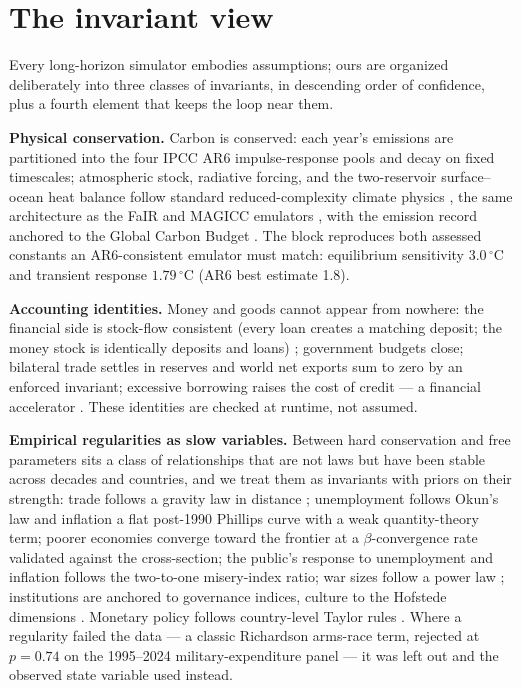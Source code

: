 \documentclass[a4paper,fleqn]{cas-sc}
\begin{document}
\section{The invariant view}
\label{sec:invariants}

Every long-horizon simulator embodies assumptions; ours are organized deliberately into three
classes of invariants, in descending order of confidence, plus a fourth element that keeps the
loop near them.

\textbf{Physical conservation.} Carbon is conserved: each year's emissions are partitioned into
the four IPCC AR6 impulse-response pools and decay on fixed timescales; atmospheric stock,
radiative forcing, and the two-reservoir surface--ocean heat balance follow standard
reduced-complexity climate physics \citep{joos2013,geoffroy2013,ipcc_ar6_wg1}, the same
architecture as the FaIR and MAGICC emulators \citep{smith2018fair,meinshausen2011}, with the
emission record anchored to the Global Carbon Budget \citep{friedlingstein2023}. The block reproduces both
assessed constants an AR6-consistent emulator must match: equilibrium sensitivity
$3.0\,^{\circ}$C and transient response $1.79\,^{\circ}$C (AR6 best estimate 1.8).

\textbf{Accounting identities.} Money and goods cannot appear from nowhere: the financial side
is stock-flow consistent (every loan creates a matching deposit; the money stock is identically
deposits and loans) \citep{godley2007}; government budgets close; bilateral trade settles in
reserves and world net exports sum to zero by an enforced invariant; excessive borrowing raises
the cost of credit --- a financial accelerator \citep{bernanke1999}. These identities are
checked at runtime, not assumed.

\textbf{Empirical regularities as slow variables.} Between hard conservation and free
parameters sits a class of relationships that are not laws but have been stable across decades
and countries, and we treat them as invariants with priors on their strength: trade follows a
gravity law in distance \citep{headmayer2014}; unemployment follows Okun's law and inflation a
flat post-1990 Phillips curve with a weak quantity-theory term; poorer economies converge
toward the frontier at a $\beta$-convergence rate validated against the cross-section; the
public's response to unemployment and inflation follows the two-to-one misery-index ratio;
war sizes follow a power law \citep{richardson1948,clauset2009}; institutions are anchored to
governance indices, culture to the Hofstede dimensions \citep{kaufmann2011,hofstede2010}.
Monetary policy follows country-level Taylor rules \citep{taylor1993}. Where a regularity
failed the data --- a classic Richardson arms-race term, rejected at $p=0.74$ on the 1995--2024
military-expenditure panel --- it was left out and the observed state variable used instead.
\end{document}
